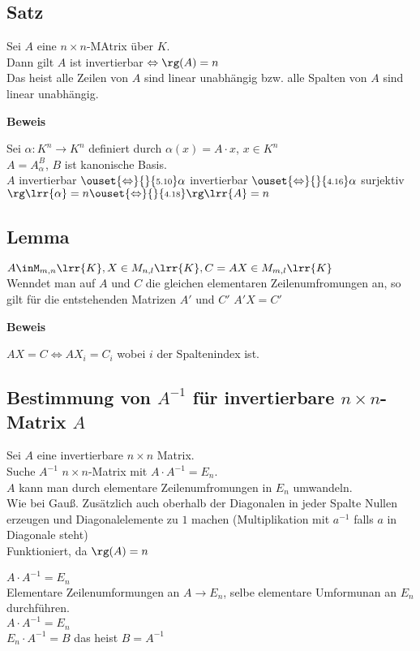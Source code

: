 \subsection{Satz}
	Sei $A$ eine $n\times n$-MAtrix über $K$.\\
	Dann gilt $A$ ist invertierbar $\Leftrightarrow\rg(A)=n$\\
	Das heist alle Zeilen von $A$ sind linear unabhängig bzw. alle Spalten von $A$ sind linear unabhängig.
	
	\textbf{Beweis}
	
	Sei $\alpha:K^n\rightarrow K^n$ definiert durch $\alpha(x)=A\cdot x$, $x\in K^n$\\
	$A=A_\alpha^B$, $B$ ist kanonische Basis.\\
	$A$ invertierbar $\ouset{\Leftrightarrow}{}{\mbox{\scriptsize 5.10}}\alpha$ invertierbar $\ouset{\Leftrightarrow}{}{\mbox{\scriptsize 4.16}}\alpha$ surjektiv $\rg\lrr{\alpha}=n\ouset{\Leftrightarrow}{}{\mbox{\scriptsize 4.18}}\rg\lrr{A}=n$
	
\subsection{Lemma}
	$A\inM_{m,n}\lrr{K}, X\in M_{n,l}\lrr{K}, C=AX\in M_{m,l}\lrr{K}$\\
	Wenndet man auf $A$ und $C$ die gleichen elementaren Zeilenumfromungen an, so gilt für die entstehenden Matrizen $A'$ und $C'$ $A'X=C'$
	
	\textbf{Beweis}
	
	$AX=C\Leftrightarrow AX_i=C_i$ wobei $i$ der Spaltenindex ist.
	
\subsection{Bestimmung von \texorpdfstring{$A^{-1}$ für invertierbare $n\times n$- Matrix $A$}{invertierbarer Matrix}}
	Sei $A$ eine invertierbare $n\times n$ Matrix.\\
	Suche $A^{-1}$ $n\times n$-Matrix mit $A\cdot A^{-1}=E_n$.\\
	$A$ kann man durch elementare Zeilenumfromungen in $E_n$ umwandeln. \\
	Wie bei Gauß. Zusätzlich auch oberhalb der Diagonalen in jeder Spalte Nullen erzeugen und Diagonalelemente zu $1$ machen (Multiplikation mit $a^{-1}$ falls $a$ in Diagonale steht)\\
	Funktioniert, da $\rg(A)=n$
	
	$A\cdot A^{-1} =E_n$\\
	Elementare Zeilenumformungen an $A\rightarrow E_n$, selbe elementare Umformunan an $E_n$ durchführen.\\
	$A\cdot A^{-1} =E_n$\\
	$E_n\cdot A^{-1} = B$ das heist $B=A^{-1}$
	
